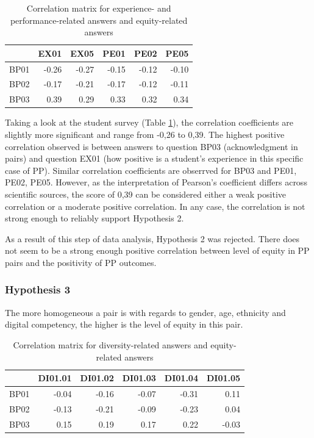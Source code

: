 \documentclass[conference]{IEEEtran}
\begin{document}
\begin{table}[ht]
    \centering
    \begin{tabular}{|l|r|r|r|r|r|}
    \hline
    {} &      EX01 &      EX05 & PE01 & PE02 & PE05 \\
    \hline
    BP01 & -0.26 & -0.27 & -0.15 & -0.12 & -0.10 \\
    \hline
    BP02 & -0.17 & -0.21 & -0.17 & -0.12 & -0.11\\
    \hline
    BP03 &  0.39 &  0.29 & 0.33 & 0.32 & 0.34\\
    \hline
    \end{tabular}
    \caption{Correlation matrix for experience- and performance-related answers and equity-related answers}
    \label{tab:table3}
\end{table}

Taking a look at the student survey (Table \ref{tab:table3}), the correlation coefficients are slightly more significant and range from -0,26 to 0,39. The highest positive correlation observed is between answers to question BP03 (acknowledgment in pairs) and question EX01 (how positive is a student's experience in this specific case of PP). Similar correlation coefficients are obserrved for BP03 and PE01, PE02, PE05. However, as the interpretation of Pearson's coefficient differs across scientific sources, the score of 0,39 can be considered either a weak positive correlation or a moderate positive correlation. In any case, the correlation is not strong enough to reliably support Hypothesis 2.

As a result of this step of data analysis, Hypothesis 2 was rejected. There does not seem to be a strong enough positive correlation between level of equity in PP pairs and the positivity of PP outcomes. 

\subsubsection{Hypothesis 3}
The more homogeneous a pair is with regards to gender, age, ethnicity and digital competency, the higher is the level of equity in this pair.

\begin{table}[ht]
    \centering
    \begin{tabular}{|l|r|r|r|r|r|}
    \hline
    {} &   DI01.01 &   DI01.02 &   DI01.03 &   DI01.04 &   DI01.05 \\
    \hline
    BP01 & -0.04 & -0.16 & -0.07 & -0.31 &  0.11 \\
    \hline
    BP02 & -0.13 & -0.21 & -0.09 & -0.23 &  0.04 \\
    \hline
    BP03 &  0.15 &  0.19 &  0.17 &  0.22 & -0.03 \\
    \hline
    \end{tabular}
    \caption{Correlation matrix for diversity-related answers and equity-related answers}
    \label{tab:table4}
\end{table}
\end{document}
